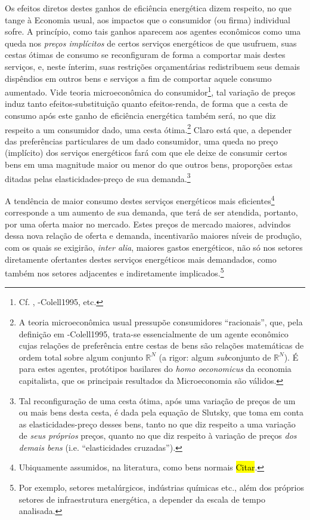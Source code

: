 Os efeitos diretos destes ganhos de eficiência energética dizem respeito, no que tange à Economia usual, aos impactos que o consumidor (ou firma) individual sofre. A princípio, como tais ganhos aparecem aos agentes econômicos como uma queda nos \textit{preços implícitos} de certos serviços energéticos de que usufruem, suas cestas ótimas de consumo se reconfiguram de forma a comportar mais destes serviços, e, neste ínterim, suas restrições orçamentárias redistribuem seus demais dispêndios em outros bens e serviços a fim de comportar aquele consumo aumentado. Vide teoria microeconômica do consumidor\footnote{Cf. \textcite{Varian2014}, \textcite{Mas}-Colell1995, \textcite{Cowell2004} etc.}, tal variação de preços induz tanto efeitos-substituição quanto efeitos-renda, de forma que a cesta de consumo após este ganho de eficiência energética também será, no que diz respeito a um consumidor dado, uma cesta ótima.\footnote{A teoria microeconômica usual pressupõe consumidores ``racionais'', que, pela definição em \textcite{Mas}-Colell1995, trata-se essencialmente de um agente econômico cujas relações de preferência entre cestas de bens são relações matemáticas de ordem total sobre algum conjunto $\mathbb{R}^{N}$ (a rigor: algum \textit{sub}conjunto de $\mathbb{R}^{N}$). É para estes agentes, protótipos basilares do \textit{homo oeconomicus} da economia capitalista, que os principais resultados da Microeconomia são válidos. } Claro está que, a depender das preferências particulares de um dado consumidor, uma queda no preço (implícito) dos serviços energéticos fará com que ele deixe de consumir certos bens em uma magnitude maior ou menor do que outros bens, proporções estas ditadas pelas elasticidades-preço de sua demanda.\footnote{Tal reconfiguração de uma cesta ótima, após uma variação de preços de um ou mais bens desta cesta, é dada pela equação de Slutsky, que toma em conta as elasticidades-preço desses bens, tanto no que diz respeito a uma variação de \textit{seus próprios} preços, quanto no que diz respeito à variação de preços \textit{dos demais bens} (i.e. ``elasticidades cruzadas'').}

A tendência de maior consumo destes serviços energéticos mais eficientes\footnote{Ubiquamente assumidos, na literatura, como bens normais \hl{Citar}.} corresponde a um aumento de sua demanda, que terá de ser atendida, portanto, por uma oferta maior no mercado. Estes preços de mercado maiores, advindos dessa nova relação de oferta e demanda, incentivarão maiores níveis de produção, com os quais se exigirão, \textit{inter alia}, maiores gastos energéticos, não só nos setores diretamente ofertantes destes serviços energéticos mais demandados, como também nos setores adjacentes e indiretamente implicados.\footnote{Por exemplo, setores metalúrgicos, indústrias químicas etc., além dos próprios setores de infraestrutura energética, a depender da escala de tempo analisada. } 


